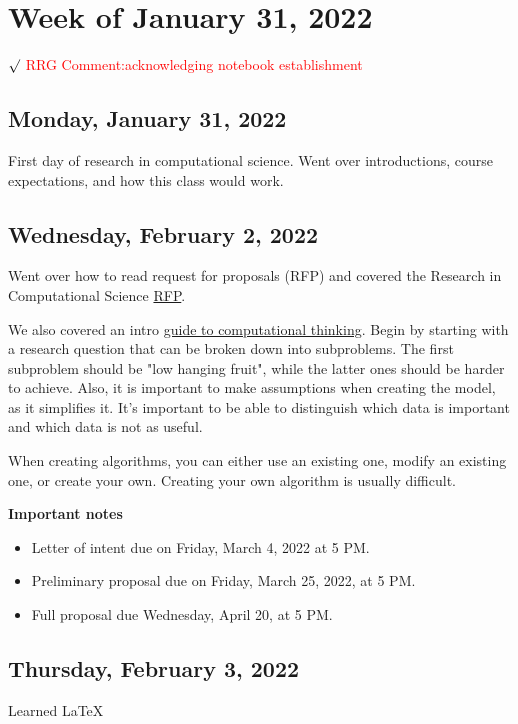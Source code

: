 \documentclass[11pt,letterpaper]{article}
\begin{document}
\univlogo

\section{Week of January 31, 2022}

$\surd$ {\Large \textcolor{red}{RRG Comment:acknowledging notebook establishment } } 

\subsection{Monday, January 31, 2022}
First day of research in computational science. Went over introductions, course expectations, and how this class would work.

\subsection{Wednesday, February 2, 2022}
Went over how to read request for proposals (RFP) and covered the Research in Computational Science \href{https://drive.google.com/file/d/1cvPQnz40H3bqiEyOdgzRMyYjtK4gxPB5/view?usp=sharing}{RFP}.


We also covered an intro \href{https://drive.google.com/file/d/1hlGEsI95i6WEo5NzAbqjr73ax-MP5L8G/view?usp=sharing}{guide to computational thinking}. Begin by starting with a research question that can be broken down into subproblems. The first subproblem should be "low hanging fruit", while the latter ones should be harder to achieve. Also, it is important to make assumptions when creating the model, as it simplifies it. It's important to be able to distinguish which data is important and which data is not as useful. 

When creating algorithms, you can either use an existing one, modify an existing one, or create your own. Creating your own algorithm is usually difficult. 

\textbf{Important notes}
\begin{itemize}
    \item Letter of intent due on Friday, March 4, 2022 at 5 PM. 
    \item Preliminary proposal due on Friday, March 25, 2022, at 5 PM. 
    \item Full proposal due Wednesday, April 20, at 5 PM. 
\end{itemize}

\subsection{Thursday, February 3, 2022}
Learned \LaTeX 
\end{document}
